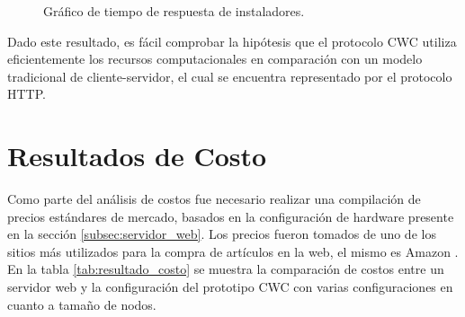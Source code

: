 \begin{figure}[h!]
  \begin{center}    
    
    \caption{Gráfico de tiempo de respuesta de instaladores.}
  \label{fig:respuesta_instaladores}
  \end{center}
\end{figure}

Dado este resultado, es fácil comprobar la hipótesis que el protocolo CWC utiliza eficientemente los recursos computacionales en comparación con un modelo tradicional de cliente-servidor, el cual se encuentra representado por el protocolo HTTP. 

\section{Resultados de Costo}
Como parte del análisis de costos fue necesario realizar una compilación de precios estándares de mercado, basados en la configuración de hardware presente en la sección \ref{subsec:servidor_web}. Los precios fueron tomados de uno de los sitios más utilizados para la compra de artículos en la web, el mismo es Amazon \cite{amazon:cpu, amazon:hd, amazon:memoria, amazon:network}. En la tabla \ref{tab:resultado_costo} se muestra la comparación de costos entre un servidor web y la configuración del prototipo CWC con varias configuraciones en cuanto a tamaño de nodos. 

